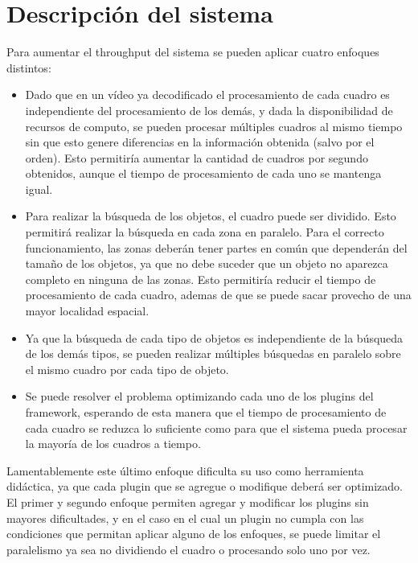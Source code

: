 
\section{Descripción del sistema}

Para aumentar el throughput del sistema se pueden aplicar cuatro enfoques distintos:

\begin{itemize}

	\item 	Dado que en un vídeo ya decodificado el procesamiento de cada
		cuadro es independiente del procesamiento de los demás, y dada
		la disponibilidad de recursos de computo, se pueden procesar
		múltiples cuadros al mismo tiempo sin que esto genere
		diferencias en la información obtenida (salvo por el orden).
		Esto permitiría aumentar la cantidad de cuadros por segundo
		obtenidos, aunque el tiempo de procesamiento de cada uno se
		mantenga igual.

	\item	Para realizar la búsqueda de los objetos, el cuadro puede ser
		dividido. Esto permitirá realizar la búsqueda en cada zona en
		paralelo. Para el correcto funcionamiento, las zonas deberán
		tener partes en común que dependerán del tamaño de los objetos,
		ya que no debe suceder que un objeto no aparezca completo en
		ninguna de las zonas. Esto permitiría reducir el tiempo de
		procesamiento de cada cuadro, ademas de que se puede sacar
		provecho de una mayor localidad espacial.

	\item	Ya que la búsqueda de cada tipo de objetos es independiente de
		la búsqueda de los demás tipos, se pueden realizar múltiples
		búsquedas en paralelo sobre el mismo cuadro por cada tipo de
		objeto.

	\item	Se puede resolver el problema optimizando cada uno de los
		plugins del framework, esperando de esta manera que el tiempo de
		procesamiento de cada cuadro se reduzca lo suficiente como para
		que el sistema pueda procesar la mayoría de los cuadros a
		tiempo.

\end{itemize}

Lamentablemente este último enfoque dificulta su uso como herramienta didáctica,
ya que cada plugin que se agregue o modifique deberá ser optimizado. El primer y
segundo enfoque permiten agregar y modificar los plugins sin mayores
dificultades, y en el caso en el cual un plugin no cumpla con las condiciones
que permitan aplicar alguno de los enfoques, se puede limitar el paralelismo ya
sea no dividiendo el cuadro o procesando solo uno por vez.

